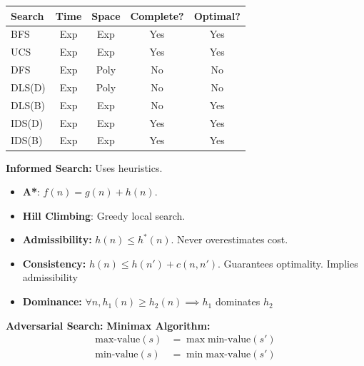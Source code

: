 \documentclass[8pt,twocolumn]{article}
\begin{document}
\maketitle
{}
\setlength{\extrarowheight}{0pt}
\setlength{\parskip}{0pt}
\begin{tabular}{|l|c|c|c|c|}
    \hline
    \textbf{Search} & \textbf{Time} & \textbf{Space} & \textbf{Complete?} & \textbf{Optimal?} \\
    \hline
    BFS  & Exp & Exp  & Yes  & Yes  \\
    UCS  & Exp & Exp  & Yes  & Yes  \\
    DFS  & Exp & Poly & No   & No   \\
    DLS(D)  & Exp & Poly & No   & No   \\
    DLS(B)  & Exp & Exp & No   & Yes   \\
    IDS(D)  & Exp & Exp  & Yes  & Yes  \\
    IDS(B)  & Exp & Exp  & Yes  & Yes  \\
    \hline
\end{tabular}
\newline
\textbf{Informed Search:} Uses heuristics.
\vspace{-0.6em}
\begin{itemize}
    \setlength{\itemsep}{0pt}
    \setlength{\parskip}{0pt}
    \item \textbf{A*}: $f(n) = g(n) + h(n)$.
    \item \textbf{Hill Climbing}: Greedy local search.
\end{itemize}
\vspace{-0.6em}
\vspace{-0.6em}
\begin{itemize}
    \setlength{\itemsep}{0pt}
    \setlength{\parskip}{0pt}
    \item \textbf{Admissibility:} $h(n) \leq h^*(n)$. Never overestimates cost.
    \item \textbf{Consistency:} $h(n) \leq h(n') + c(n, n')$. Guarantees optimality. Implies admissibility
    \item \textbf{Dominance:} $\forall n, h_1(n) \geq h_2(n) \implies h_1$ dominates $h_2$
\end{itemize}
\vspace{-0.6em}
\textbf{Adversarial Search:}
\textbf{Minimax Algorithm:}
\begin{align*}
    \text{max-value}(s) &= \max \text{min-value}(s') \\
    \text{min-value}(s) &= \min \text{max-value}(s')
\end{align*}
\end{document}
